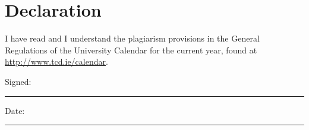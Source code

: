 \documentclass[a4paper,oneside,12pt]{book}
\title{\thesistitle}
\author{\authorname}
\numberwithin{equation}{chapter} %
\begin{document}

\section*{\Huge\textcolor{tcd_blue}{Declaration}}
\vspace{1cm}
I have read and I understand the plagiarism provisions in the General Regulations of the University Calendar for the current year, found at \url{http://www.tcd.ie/calendar}.
\vspace{1cm}


\vspace{3cm}

Signed:~\rule{5cm}{0.3pt}\hfill Date:~\rule{5cm}{0.3pt}








\newpage
\onehalfspacing %

\end{document}
